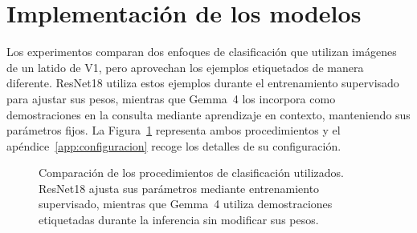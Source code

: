 \section{Implementación de los modelos}
\label{chap:modelos}

Los experimentos comparan dos enfoques de clasificación que utilizan imágenes de un latido de V1, pero aprovechan los ejemplos etiquetados de manera diferente. ResNet18 utiliza estos ejemplos durante el entrenamiento supervisado para ajustar sus pesos, mientras que Gemma~4 los incorpora como demostraciones en la consulta mediante aprendizaje en contexto, manteniendo sus parámetros fijos. La Figura~\ref{fig:diseno_experimental_resumen} representa ambos procedimientos y el apéndice~\ref{app:configuracion} recoge los detalles de su configuración.

\begin{figure}[H]
  \centering
  \caption{Comparación de los procedimientos de clasificación utilizados. ResNet18 ajusta sus parámetros mediante entrenamiento supervisado, mientras que Gemma~4 utiliza demostraciones etiquetadas durante la inferencia sin modificar sus pesos.}
  \label{fig:diseno_experimental_resumen}
\end{figure}



